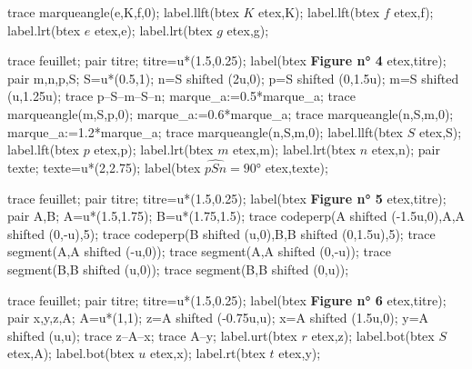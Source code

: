 \begin{corrige}
\begin{changemargin}{0mm}{-20mm}
\begin{Geometrie}[CoinHD={(3u,3u)}]
            trace marqueangle(e,K,f,0);
            label.llft(btex $K$ etex,K);
            label.lft(btex $f$ etex,f);
            label.lrt(btex $e$ etex,e);
            label.lrt(btex $g$ etex,g);
        \end{Geometrie}
        \par\smallskip
        \begin{Geometrie}[CoinHD={(3u,3u)}]
            trace feuillet;
            pair titre;
            titre=u*(1.5,0.25);
            label(btex {\bfseries Figure n° 4 } etex,titre);
            pair m,n,p,S;
            S=u*(0.5,1);
            n=S shifted (2u,0);
            p=S shifted (0,1.5u);
            m=S shifted (u,1.25u);
            trace p--S--m--S--n;
            marque_a:=0.5*marque_a;
            trace marqueangle(m,S,p,0);
            marque_a:=0.6*marque_a;
            trace marqueangle(n,S,m,0);
            marque_a:=1.2*marque_a;
            trace marqueangle(n,S,m,0);
            label.llft(btex $S$ etex,S);
            label.lft(btex $p$ etex,p);
            label.lrt(btex $m$ etex,m);
            label.lrt(btex $n$ etex,n);
            pair texte;
            texte=u*(2,2.75);
            label(btex $\widehat{pSn}=\ang{90}$ etex,texte);
        \end{Geometrie}
        \begin{Geometrie}[CoinHD={(3u,3u)}]
            trace feuillet;
            pair titre;
            titre=u*(1.5,0.25);        
            label(btex {\bfseries Figure n° 5 } etex,titre);
            pair A,B;
            A=u*(1.5,1.75);
            B=u*(1.75,1.5);
            trace codeperp(A shifted (-1.5u,0),A,A shifted (0,-u),5);
            trace codeperp(B shifted (u,0),B,B shifted (0,1.5u),5);
            trace segment(A,A shifted (-u,0));
            trace segment(A,A shifted (0,-u));
            trace segment(B,B shifted (u,0));
            trace segment(B,B shifted (0,u));
        \end{Geometrie}
        \begin{Geometrie}[CoinHD={(3u,3u)}]
            trace feuillet;
            pair titre;
            titre=u*(1.5,0.25);
            label(btex {\bfseries Figure n° 6 } etex,titre);
            pair x,y,z,A;
            A=u*(1,1);
            z=A shifted (-0.75u,u);
            x=A shifted (1.5u,0);
            y=A shifted (u,u);
            trace z--A--x;
            trace A--y;
            label.urt(btex $r$ etex,z);
            label.bot(btex $S$ etex,A);
            label.bot(btex $u$ etex,x);
            label.rt(btex $t$ etex,y);

\end{Geometrie}
\end{changemargin}
\end{corrige}

